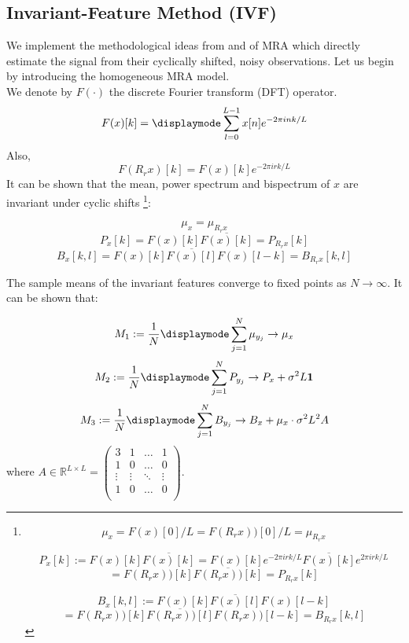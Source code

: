 \documentclass[sigconf]{acmart}
\begin{document}
\subsection{Invariant-Feature Method (IVF)}
\label{sec:IVF}
We implement the methodological ideas from \cite{heteroMRA} and \cite{Bendory2018Feb} of MRA which directly estimate the signal from their cyclically shifted, noisy observations. Let us begin by introducing the homogeneous MRA model. \\
We denote by $F(\cdot)$ the discrete Fourier transform (DFT) operator.
$$F(x)[k] = \displaymode \sum_{l=0}^{L-1} x[n]e^{-2\pi ink/L}$$
Also,
$$F(R_rx)[k] = F(x)[k]e^{-2\pi irk/L}$$
It can be shown that the mean, power spectrum and bispectrum of $x$ are invariant under cyclic shifts \footnote{
$$\mu_x = F(x)[0]/L = F(R_rx))[0]/L = \mu_{R_rx} $$
    

    $$P_x[k] := F(x)[k] \overline{F(x)[k]} = F(x)[k]e^{-2\pi irk/L} \overline{F(x)[k]}e^{2\pi irk/L} $$
    $$= F(R_rx))[k] \overline{F(R_rx))[k]} = P_{R_rx}[k]$$

    $$B_x[k,l] := F(x)[k] \overline{F(x)[l]}F(x)[l-k] $$ 
    $$= F(R_rx))[k] \overline{F(R_rx))[l]}F(R_rx))[l-k] = B_{R_rx}[k,l]$$
}:

\begin{equation}
    \mu_x  = \mu_{R_rx}
\end{equation}
\begin{equation}
    P_x[k] = F(x)[k] \overline{F(x)[k]} = P_{R_rx}[k]
\end{equation}
\begin{equation}
    B_x[k,l] = F(x)[k] \overline{F(x)[l]}F(x)[l-k] = B_{R_rx}[k,l]
\end{equation}

The sample means of the invariant features converge to fixed points as $N \rightarrow \infty$. It can be shown that:

\begin{equation}
    M_1 := \frac{1}{N}\displaymode\sum_{j=1}^{N}\mu_{y_j} \rightarrow \mu_x
\end{equation}
\begin{equation}
    M_2 := \frac{1}{N}\displaymode\sum_{j=1}^{N}P_{y_j} \rightarrow P_x + \sigma^2L\mathbf{1}
\end{equation}
\begin{equation}
    M_3 := \frac{1}{N}\displaymode\sum_{j=1}^{N}B_{y_j} \rightarrow B_x + \mu_x\cdot\sigma^2L^2A
\end{equation}
where
$A \in \mathbb{R}^{L\times L} = 
    \begin{pmatrix}
    3 & 1 & \hdots & 1 \\
    1 & 0 & \hdots & 0 \\
    \vdots & \vdots &  \ddots  & \vdots \\
    1 & 0     &\hdots &  0  \\
    \end{pmatrix}.$\\
\end{document}
